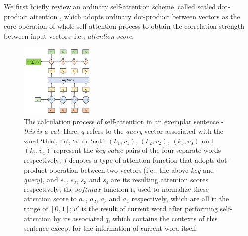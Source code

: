 We first briefly review an ordinary self-attention scheme, called scaled dot-product attention \cite{vaswani2017attention}, which adopts ordinary dot-product between vectors as the core operation of whole self-attention process to obtain the correlation strength between input vectors, i.e., \textit{attention score}. 


\begin{figure}[!ht]
    \centering
    \includegraphics[width=0.32\textwidth]{pictures/Attention.png}
    \caption{The calculation process of self-attention in an exemplar sentence - \textit{this is a cat}. Here, $q$ refers to the \textit{query} vector associated with the word ‘this’, ‘is’, ‘a’ or ‘cat’; $(k_1, v_1)$, $(k_2, v_2)$, $(k_3, v_3)$ and $(k_4, v_4)$ represent the \textit{key-value} pairs of the four separate words respectively; $f$ denotes a type of attention function that adopts dot-product operation between two vectors (i.e., the above \textit{key} and \textit{query}), and $s_1$, $s_2$, $s_3$ and $s_4$ are its resulting attention scores respectively; the $softmax$ function is used to normalize these attention score to $a_1$, $a_2$, $a_3$ and $a_4$ respectively, which are all in the range of $[0, 1]$; $v'$ is the result of current word after performing self-attention by its associated $q$, which contains the contexts of this sentence except for the information of current word itself.}
    \label{fig:attention}
\end{figure}


